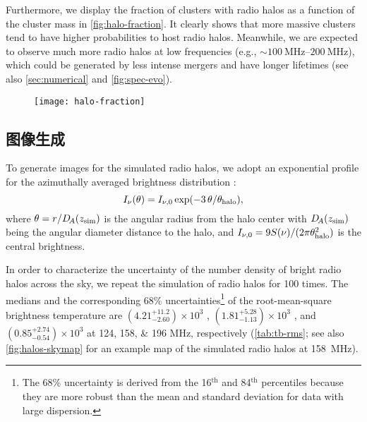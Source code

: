 Furthermore, we display the fraction of clusters with radio halos as a
function of the cluster mass in \autoref{fig:halo-fraction}.
It clearly shows that more massive clusters tend to have higher
probabilities to host radio halos.
Meanwhile, we are expected to observe much more radio halos at low
frequencies (e.g., $\sim \SIrange{100}{200}{\MHz}$), which could be
generated by less intense mergers and have longer lifetimes (see also
\autoref{sec:numerical} and \autoref{fig:spec-evo}).

\begin{figure}[htp]
  \centering
  \texttt{[image: halo-fraction]}
  \label{fig:halo-fraction}
\end{figure}

\subsection{图像生成}
\label{sec:halo-maps}

To generate images for the simulated radio halos, we adopt an
exponential profile for the azimuthally averaged brightness distribution
\cite{murgia2009}:
\begin{equation}
  \label{eq:halo-profile}
  I_{\nu}(\theta) = I_{\nu,0} \exp(-3 \,\theta / \theta_{\mathrm{halo}}),
\end{equation}
where $\theta = r / D_{\!A}(z_{\mathrm{sim}})$ is the angular radius from the
halo center with $D_{\!A}(z_{\mathrm{sim}})$ being the angular diameter
distance to the halo,
and $I_{\nu,0} = 9 S(\nu) / (2\pi \theta^2_{\mathrm{halo}})$ is the central
brightness.

In order to characterize the uncertainty of the number density of bright
radio halos across the sky, we repeat the simulation of radio halos
for 100 times.
The medians and the corresponding 68\% uncertainties\footnote{%
  The 68\% uncertainty is derived from the 16$^{\text{th}}$
  and 84$^{\text{th}}$ percentiles because they are more robust than the
  mean and standard deviation for data with large dispersion.}
of the root-mean-square brightness temperature are
$\left(4.21_{-2.60}^{+11.2}\right) \times 10^3$ \si{\mK},
$\left(1.81_{-1.13}^{+5.28}\right) \times 10^3$ \si{\mK}, and
$\left(0.85_{-0.54}^{+2.74}\right) \times 10^3$ \si{\mK}
at \numlist{124; 158; 196} \si{\MHz}, respectively
(\autoref{tab:tb-rms}; see also \autoref{fig:halos-skymap} for an
example map of the simulated radio halos at \SI{158}{\MHz}).

